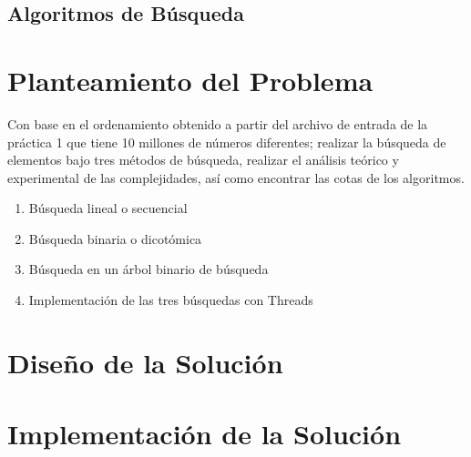 \documentclass[12pt, fleqn]{article}                             %
\theoremstyle{break}                                            %
\begin{document}
    \subsection{Algoritmos de Búsqueda}




\clearpage
\section{Planteamiento del Problema}


    Con base en el ordenamiento obtenido a partir del archivo de entrada de la práctica
    1 que tiene 10 millones de números diferentes; realizar la búsqueda de elementos
    bajo tres métodos de búsqueda, realizar el análisis teórico y experimental
    de las complejidades, así como encontrar las cotas de los algoritmos.
    
    \begin{enumerate}\setlength\itemsep{0em}
        \item Búsqueda lineal o secuencial
        \item Búsqueda binaria o dicotómica
        \item Búsqueda en un árbol binario de búsqueda
        \item Implementación de las tres búsquedas con Threads
    \end{enumerate}


\clearpage
\section{Diseño de la Solución}




\clearpage
\section{Implementación de la Solución}
\end{document}
